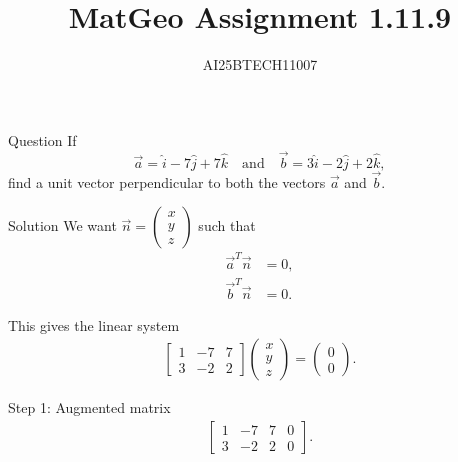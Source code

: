 \documentclass{beamer}
\title 
{MatGeo Assignment 1.11.9}
\author
{AI25BTECH11007}
\begin{document}
\frame{\titlepage}
\begin{frame}{Question}
If
\[
\vec{a} = \hat{i} - 7\hat{j} + 7\hat{k}
\quad \text{and} \quad
\vec{b} = 3\hat{i} - 2\hat{j} + 2\hat{k},
\]
find a unit vector perpendicular to both the vectors $\vec{a}$ and $\vec{b}$.\\
\end{frame}
\begin{frame}{Solution}
We want $\vec{n} = \begin{pmatrix}x\\y\\z\end{pmatrix}$ such that
\begin{align}
\vec{a}^T \vec{n} &= 0, \label{eq:orth1}\\
\vec{b}^T \vec{n} &= 0. \label{eq:orth2}
\end{align}

This gives the linear system
\begin{align}
\begin{bmatrix}
1 & -7 & 7\\
3 & -2 & 2
\end{bmatrix}
\begin{pmatrix}x\\y\\z\end{pmatrix}
= \begin{pmatrix}0\\0\end{pmatrix}. \label{eq:system}
\end{align}

Step 1: Augmented matrix\\
\begin{align}
\left[\begin{array}{ccc|c}
1 & -7 & 7 & 0\\
3 & -2 & 2 & 0
\end{array}\right]. \label{eq:aug}
\end{align}
\end{frame}
\end{document}
